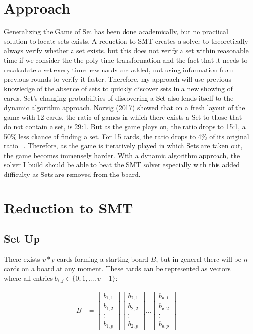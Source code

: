 \documentclass[pageno]{jpaper}
\begin{document}
\section{Approach}

Generalizing the Game of Set has been done academically, but no practical solution to locate sets exists. A reduction to SMT creates a solver to theoretically always verify whether a set exists, but this does not verify a set within reasonable time if we consider the the poly-time transformation and the fact that it needs to recalculate a set every time new cards are added, not using information from previous rounds to verify it faster. Therefore, my approach will use previous knowledge of the absence of sets to quickly discover sets in a new showing of cards. Set's changing probabilities of discovering a Set also lends itself to the dynamic algorithm approach. Norvig (2017) showed that on a fresh layout of the game with 12 cards, the ratio of games in which there exists a Set to those that do not contain a set, is 29:1. But as the game plays on, the ratio drops to 15:1, a 50\% less chance of finding a set. For 15 cards, the ratio drops to 4\% of its original ratio ~\cite{norvig}. Therefore, as the game is iteratively played in which Sets are taken out, the game becomes immensely harder. With a dynamic algorithm approach, the solver I build should be able to beat the SMT solver especially with this added difficulty as Sets are removed from the board. 


\section{Reduction to SMT}

\subsection{Set Up}

There exists $v*p$ cards forming a starting board $B$, but in general there will be $n$ cards on a board at any moment. These cards can be represented as vectors where all entries $b_{i,j} \in \{0,1, ... , v-1\}$:

\begin{align}
    B &= \begin{bmatrix}
           b_{1,1} \\
           b_{1,2} \\
           \vdots \\
           b_{1,p}
         \end{bmatrix}
         \begin{bmatrix}
           b_{2,1} \\
           b_{2,2} \\
           \vdots \\
           b_{2,p}
         \end{bmatrix} ... 
          \begin{bmatrix}
           b_{n,1} \\
           b_{n,2} \\
           \vdots \\
           b_{n,p}
         \end{bmatrix}
  \end{align}
  
\end{document}
